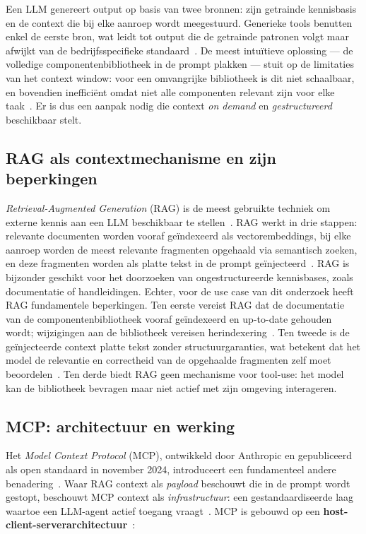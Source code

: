 Een LLM genereert output op basis van twee bronnen: zijn getrainde kennisbasis en de context die bij elke aanroep wordt meegestuurd. Generieke tools benutten enkel de eerste bron, wat leidt tot output die de getrainde patronen volgt maar afwijkt van de bedrijfsspecifieke standaard~\autocite{Fang2024}. De meest intuïtieve oplossing --- de volledige componentenbibliotheek in de prompt plakken --- stuit op de limitaties van het context window: voor een omvangrijke bibliotheek is dit niet schaalbaar, en bovendien inefficiënt omdat niet alle componenten relevant zijn voor elke taak~\autocite{DevContentOps2025}. Er is dus een aanpak nodig die context \textit{on demand} en \textit{gestructureerd} beschikbaar stelt.

\subsection{RAG als contextmechanisme en zijn beperkingen}
\label{subsec:rag-beperkingen}

\textit{Retrieval-Augmented Generation} (RAG) is de meest gebruikte techniek om externe kennis aan een LLM beschikbaar te stellen~\autocite{Airbyte2026}. RAG werkt in drie stappen: relevante documenten worden vooraf geïndexeerd als vectorembeddings, bij elke aanroep worden de meest relevante fragmenten opgehaald via semantisch zoeken, en deze fragmenten worden als platte tekst in de prompt geïnjecteerd~\autocite{DevContentOps2025}. RAG is bijzonder geschikt voor het doorzoeken van ongestructureerde kennisbases, zoals documentatie of handleidingen. Echter, voor de use case van dit onderzoek heeft RAG fundamentele beperkingen. Ten eerste vereist RAG dat de documentatie van de componentenbibliotheek vooraf geïndexeerd en up-to-date gehouden wordt; wijzigingen aan de bibliotheek vereisen herindexering~\autocite{Airbyte2026}. Ten tweede is de geïnjecteerde context platte tekst zonder structuurgaranties, wat betekent dat het model de relevantie en correctheid van de opgehaalde fragmenten zelf moet beoordelen~\autocite{TestRigor2026}. Ten derde biedt RAG geen mechanisme voor tool-use: het model kan de bibliotheek bevragen maar niet actief met zijn omgeving interageren.

\subsection{MCP: architectuur en werking}
\label{subsec:mcp-architectuur}

Het \textit{Model Context Protocol} (MCP), ontwikkeld door Anthropic en gepubliceerd als open standaard in november 2024, introduceert een fundamenteel andere benadering~\autocite{GoogleCloud2024}. Waar RAG context als \textit{payload} beschouwt die in de prompt wordt gestopt, beschouwt MCP context als \textit{infrastructuur}: een gestandaardiseerde laag waartoe een LLM-agent actief toegang vraagt~\autocite{TestRigor2026}. MCP is gebouwd op een \textbf{host-client-serverarchitectuur}~\autocite{MCPDocs2024}:

